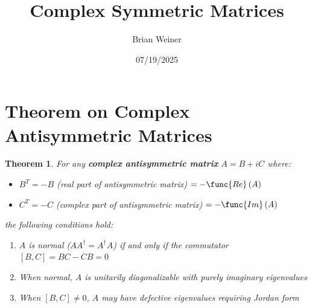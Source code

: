 \documentclass[aps,preprint]{revtex4}
\newtheorem{theorem}{Theorem}
\begin{document}
\preprint{}
\title{Complex Symmetric Matrices}
\author{Brian Weiner}
\author{}

\begin{abstract}
\end{abstract}

\date{07/19/2025}
\maketitle
\tableofcontents

\section{Theorem on Complex Antisymmetric Matrices}

\begin{theorem}
For any \textbf{complex antisymmetric matrix }$A=B+iC$ where:

\begin{itemize}
\item $B^{T}=-B$ (real part of antisymmetric matrix) $=-\func{Re}\left(
A\right) $

\item $C^{T}=-C$ (complex part of antisymmetric matrix) $=-\func{Im}\left(
A\right) $
\end{itemize}

the following conditions hold:

\begin{enumerate}
\item $A$ is normal ($AA^\dagger = A^\dagger A$) if and only if the
commutator $[B,C] = BC - CB = 0$

\item When normal, $A$ is unitarily diagonalizable with purely imaginary
eigenvalues

\item When $[B,C] \neq 0$, $A$ may have defective eigenvalues requiring
Jordan form
\end{enumerate}
\end{theorem}
\end{document}
